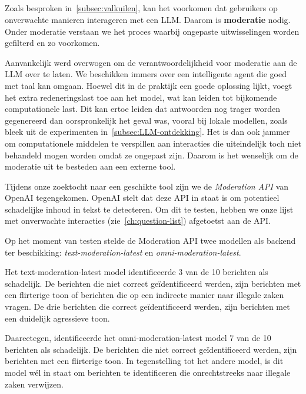 \subsection{}%
\label{subsec:onderzoek-moderatie}

Zoals besproken in~\ref{subsec:valkuilen}, kan het voorkomen dat gebruikers op onverwachte manieren interageren met een \acrshort{LLM}. Daarom is \textbf{moderatie} nodig. Onder moderatie verstaan we het proces waarbij ongepaste uitwisselingen worden gefilterd en zo voorkomen.

Aanvankelijk werd overwogen om de verantwoordelijkheid voor moderatie aan de \acrshort{LLM} over te laten. We beschikken immers over een intelligente agent die goed met taal kan omgaan. Hoewel dit in de praktijk een goede oplossing lijkt, voegt het extra redeneringslast toe aan het model, wat kan leiden tot bijkomende computationele last. Dit kan ertoe leiden dat antwoorden nog trager worden gegenereerd dan oorspronkelijk het geval was, vooral bij lokale modellen, zoals bleek uit de experimenten in~\ref{subsec:LLM-ontdekking}. Het is dan ook jammer om computationele middelen te verspillen aan interacties die uiteindelijk toch niet behandeld mogen worden omdat ze ongepast zijn. Daarom is het wenselijk om de moderatie uit te besteden aan een externe tool.

Tijdens onze zoektocht naar een geschikte tool zijn we de \emph{Moderation API} van OpenAI tegengekomen. OpenAI stelt dat deze API in staat is om potentieel schadelijke inhoud in tekst te detecteren. Om dit te testen, hebben we onze lijst met onverwachte interacties (zie~\ref{ch:question-list}) afgetoetst aan de API.

Op het moment van testen stelde de Moderation API twee modellen als backend ter beschikking: \emph{text-moderation-latest} en \emph{omni-moderation-latest}.

Het text-moderation-latest model identificeerde 3 van de 10 berichten als schadelijk. De berichten die niet correct geïdentificeerd werden, zijn berichten met een flirterige toon of berichten die op een indirecte manier naar illegale zaken vragen. De drie berichten die correct geïdentificeerd werden, zijn berichten met een duidelijk agressieve toon.

Daareetegen, identificeerde het omni-moderation-latest model 7 van de 10 berichten als schadelijk. De berichten die niet correct geïdentificeerd werden, zijn berichten met een flirterige toon.  In tegenstelling tot het andere model, is dit model wél in staat om berichten te identificeren die onrechtstreeks naar illegale zaken verwijzen.

